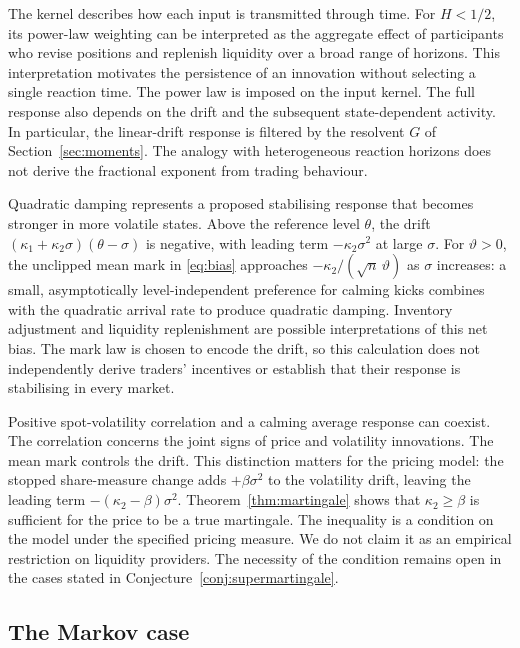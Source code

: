 \documentclass{rQUF2e}
\theoremstyle{plain}
\theoremstyle{definition}
\theoremstyle{remark}
\begin{document}
The kernel describes how each input is transmitted through time. For $H<1/2$, its power-law weighting can be interpreted as the aggregate effect of participants who revise positions and replenish liquidity over a broad range of horizons. This interpretation motivates the persistence of an innovation without selecting a single reaction time. The power law is imposed on the input kernel. The full response also depends on the drift and the subsequent state-dependent activity. In particular, the linear-drift response is filtered by the resolvent $G$ of Section~\ref{sec:moments}. The analogy with heterogeneous reaction horizons does not derive the fractional exponent from trading behaviour.

Quadratic damping represents a proposed stabilising response that becomes stronger in more volatile states. Above the reference level $\theta$, the drift $(\kappa_1+\kappa_2\sigma)(\theta-\sigma)$ is negative, with leading term $-\kappa_2\sigma^2$ at large $\sigma$. For $\vartheta>0$, the unclipped mean mark in \eqref{eq:bias} approaches $-\kappa_2/(\sqrt n\,\vartheta)$ as $\sigma$ increases: a small, asymptotically level-independent preference for calming kicks combines with the quadratic arrival rate to produce quadratic damping. Inventory adjustment and liquidity replenishment are possible interpretations of this net bias. The mark law is chosen to encode the drift, so this calculation does not independently derive traders' incentives or establish that their response is stabilising in every market.

Positive spot-volatility correlation and a calming average response can coexist. The correlation concerns the joint signs of price and volatility innovations. The mean mark controls the drift. This distinction matters for the pricing model: the stopped share-measure change adds $+\beta\sigma^2$ to the volatility drift, leaving the leading term $-(\kappa_2-\beta)\sigma^2$. Theorem~\ref{thm:martingale} shows that $\kappa_2\ge\beta$ is sufficient for the price to be a true martingale. The inequality is a condition on the model under the specified pricing measure. We do not claim it as an empirical restriction on liquidity providers. The necessity of the condition remains open in the cases stated in Conjecture~\ref{conj:supermartingale}.

\subsection{The Markov case}\label{sec:micro_markov}
\end{document}
